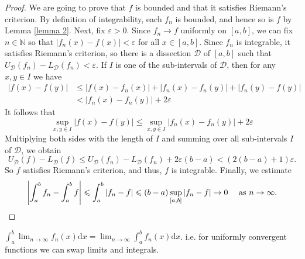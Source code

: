 \documentclass[a4paper,11pt]{article}
\begin{document}
\begin{proof}
    We are going to prove that $f$ is bounded and that it satisfies Riemann's criterion. By definition of integrability, each $f_{n}$ is bounded, and hence so is $f$ by Lemma \ref{lemma 2}.
    Next, fix $\varepsilon>0$. Since $f_{n} \rightarrow f$ uniformly on $[a, b]$, we can fix $n \in \mathbb{N}$ so that $\left|f_{n}(x)-f(x)\right|<\varepsilon$ for all $x \in[a, b]$. Since $f_{n}$ is integrable, it satisfies Riemann's criterion, so there is a dissection $\mathcal{D}$ of $[a, b]$ such that $U_{\mathcal{D}}\left(f_{n}\right)-L_{\mathcal{D}}\left(f_{n}\right)<\varepsilon$. If $I$ is one of the sub-intervals of $\mathcal{D}$, then for any $x, y \in I$ we have
    \[
    \begin{aligned}
    |f(x)-f(y)| & \leqslant\left|f(x)-f_{n}(x)\right|+\left|f_{n}(x)-f_{n}(y)\right|+\left|f_{n}(y)-f(y)\right| \\
    &<\left|f_{n}(x)-f_{n}(y)\right|+2 \varepsilon
    \end{aligned}
    \]
    It follows that
    \[
    \sup _{x, y \in I}|f(x)-f(y)| \leqslant \sup _{x, y \in I}\left|f_{n}(x)-f_{n}(y)\right|+2 \varepsilon
    \]
    Multiplying both sides with the length of $I$ and summing over all sub-intervals $I$ of $\mathcal{D}$, we obtain
    \[
    U_{\mathcal{D}}(f)-L_{\mathcal{D}}(f) \leqslant U_{\mathcal{D}}\left(f_{n}\right)-L_{\mathcal{D}}\left(f_{n}\right)+2 \varepsilon(b-a)<(2(b-a)+1) \varepsilon.
    \]
    So $f$ satisfies Riemann's criterion, and thus, $f$ is integrable.
    Finally, we estimate
    \[
    \left|\int_{a}^{b} f_{n}-\int_{a}^{b} f\right| \leqslant \int_{a}^{b}\left|f_{n}-f\right| \leqslant(b-a) \sup _{[a, b]}\left|f_{n}-f\right| \rightarrow 0 \quad \text { as } n \rightarrow \infty .\qedhere
    \]
\end{proof}
\begin{remark}
    $\int_{a}^{b} \lim _{n \rightarrow \infty} f_{n}(x) \mathrm{d} x=\lim _{n \rightarrow \infty} \int_{a}^{b} f_{n}(x) \mathrm{d} x$. i.e. for uniformly convergent functions we can swap limits and integrals.
\end{remark}
\end{document}
